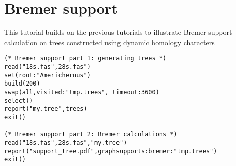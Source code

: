 \section{Bremer support}{\label{tutorial 3}}

This tutorial builds on the previous tutorials to illustrate Bremer support 
calculation on trees constructed using dynamic homology characters
    
   \begin{verbatim}
(* Bremer support part 1: generating trees *)
read("18s.fas",28s.fas")
set(root:"Americhernus")
build(200)
swap(all,visited:"tmp.trees", timeout:3600)
select()
report("my.tree",trees)
exit()

(* Bremer support part 2: Bremer calculations *)
read("18s.fas",28s.fas","my.tree")
report("support_tree.pdf",graphsupports:bremer:"tmp.trees")
exit()
\end{verbatim}

